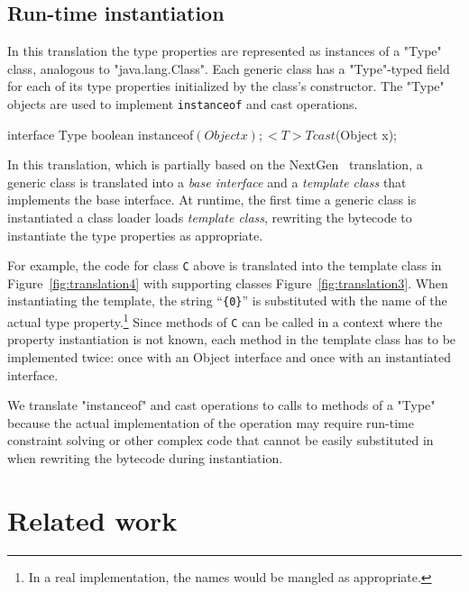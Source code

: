 \documentclass[nocopyrightspace,9pt]{sigplanconf}
\begin{document}
\subsection{Run-time instantiation}

In this translation the type properties are represented as
instances of a \xcd"Type" class, analogous to \xcd"java.lang.Class". 
Each generic class has a \xcd"Type"-typed field for each of
its type properties initialized by the class's constructor.
The \xcd"Type" objects
are used to implement {\tt instanceof} and cast operations.
\begin{xten}
interface Type {
    boolean instanceof$(Object x);
    <T> T cast$(Object x);
}
\end{xten}


In this translation, which is partially based on the
NextGen~\cite{allen03,allen04} translation,
a generic class is translated into a \emph{base interface} and
a \emph{template class} that implements the base interface.
At runtime, the first time a generic class is instantiated
a class loader loads \emph{template class}, rewriting the
bytecode to instantiate the type properties as appropriate.

For example, the 
code for class {\tt C} above is translated into the template
class in Figure~\ref{fig:translation4}
with supporting classes Figure~\ref{fig:translation3}.
When instantiating the template, the string ``{\tt \{0\}}'' is
substituted with the name of the actual type
property.\footnote{In a real implementation, the names would be
mangled as appropriate.}
Since methods of {\tt C} can be called in a context where the
property instantiation is not known, 
each method in the template class has to be implemented twice:
once with an Object interface and once with an instantiated
interface.

We translate \xcd"instanceof" and cast operations to calls to
methods of a \xcd"Type" because the actual implementation of
the operation may require run-time constraint solving or other
complex code that cannot be easily substituted in when rewriting
the bytecode during instantiation.

\section{Related work}

\cite{unifying-genericity}
\cite{adding-wildcards}
\cite{emir06}
\cite{myers94}
\cite{polyj}
\cite{allen04}
\cite{allen03}
\cite{beta}
\cite{mp89-virtual-classes}
\cite{thorup97}
\end{document}
